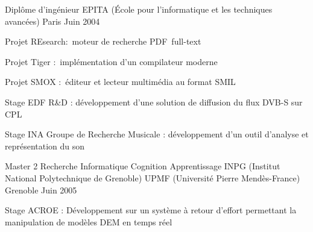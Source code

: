 

\begin{cventries}

  \cventry
    {Diplôme d'ingénieur} %
    {EPITA (École pour l'informatique et les techniques avancées)} %
    {Paris} %
    {Juin 2004} %
    {
      \begin{cvitems} %
        \item {Projet REsearch: moteur de recherche PDF full-text}
        \item {Projet Tiger : implémentation d'un compilateur moderne}
        \item {Projet SMOX : éditeur et lecteur multimédia au format SMIL}
        \item {Stage EDF R\&D : développement d'une solution de diffusion du flux DVB-S sur CPL}
        \item {Stage INA Groupe de Recherche Musicale : développement d'un outil d’analyse et représentation du son}
      \end{cvitems}
    }

  \cventry
    {Master 2 Recherche Informatique Cognition Apprentissage} %
    {INPG (Institut National Polytechnique de Grenoble) \linebreak UPMF (Université Pierre Mendès-France)} %
    {Grenoble} %
    {Juin 2005} %
    {
      \begin{cvitems} %
        \item {Stage ACROE : Développement sur un système à retour d'effort permettant la manipulation de modèles DEM en temps réel}
      \end{cvitems}
    }

\end{cventries}

